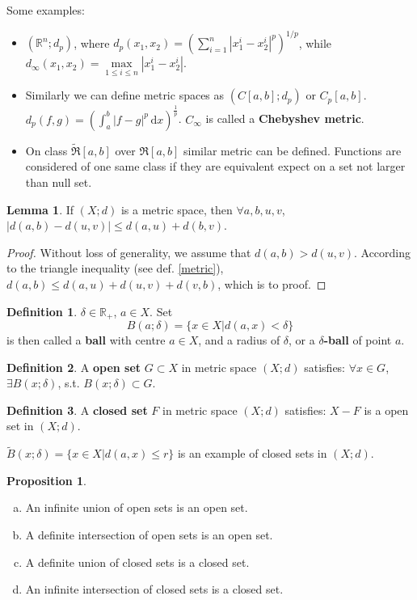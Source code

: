 \documentclass{article}
\theoremstyle{plain}
\theoremstyle{definition}
\newtheorem{dfn}{Definition}[section] %
\newtheorem{lmm}{Lemma} %
\newtheorem{prp}{Proposition} %
\begin{document}
Some examples:
\begin{itemize}
\item $(\mathbb{R}^n;d_p)$, where $d_p(x_1,x_2)=\left(\sum^n_{i=1}\left|x^i_1-x^i_2\right|^p\right)^{1/p}$, while $d_\infty(x_1,x_2)=
\max\limits_{1\leqslant i\leqslant n}
\left|x^i_1-x^i_2\right|$.
\item Similarly we can define metric spaces as $(C[a,b];d_p)$ or $C_p[a,b]$. $d_p(f,g)=\left(
	\int^b_a\left|f-g\right|^p\,\mathrm{d}x
\right)^{\frac{1}{p}}$. $C_\infty$ is called a \textbf{Chebyshev metric}.
\item On class $\mathfrak{\tilde{R}}[a,b]$ over $\mathfrak{R}[a,b]$ similar metric can be defined. Functions are considered of one same class if they are equivalent expect on a set not larger than null set. 
\end{itemize}
\begin{lmm}\label{quadruple_inequality}
If $(X;d)$ is a metric space, then $\forall a,b,u,v $, $\left| d(a,b) - d(u,v) \right| \leq d(a,u)+d(b,v) $.
\end{lmm}
\begin{proof}
	Without loss of generality, we assume that $d(a,b) > d(u,v)$. According to the triangle inequality (see def. \ref{metric}), $d(a,b) \leq d(a,u)+d(u,v)+d(v,b)$, which is to proof.  
\end{proof}
\begin{dfn}\label{delta_ball}
$\delta\in\mathbb{R}_+$, $a\in X$. Set
\[
	B(a;\delta)=\{x\in X|d(a,x)<\delta\}
\]
is then called a \textbf{ball} with centre $a\in X$, and a radius of $\delta$, or a \textbf{$\delta$-ball} of point $a$.
\end{dfn}
\begin{dfn}\label{open_set}
A \textbf{open set} $G\subset X$ in metric space $(X;d)$ satisfies: $\forall x\in G$, $\exists B(x;\delta)$, s.t. $B(x;\delta)\subset G$.
\end{dfn}
\begin{dfn}\label{closed_set}
A \textbf{closed set} $F$ in metric space $(X;d)$ satisfies: $X-F$ is a open set in $(X;d)$.
\end{dfn}
$\tilde{B}(x;\delta)=\{x\in X|d(a,x)\leq r\}$ is an example of closed sets in $(X;d)$.
\begin{prp}\label{open_sets_metric}
\begin{enumerate}[a)]
\item An infinite union of open sets is an open set.
\item A definite intersection of open sets is an open set.
\item A definite union of closed sets is a closed set.
\item An infinite intersection of closed sets is a closed set.
\end{enumerate}
\end{prp}
\end{document}
